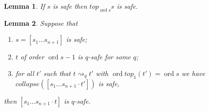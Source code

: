 \documentclass{article}
\newcommand{\ord}{\mathop{\mathrm{ord}}}
\newtheorem{lemma}{Lemma}[section]
\theoremstyle{remark}
\theoremstyle{definition}
\newcommand\saferel\rightsquigarrow
\begin{document}
\begin{lemma}
If $s$ is safe then $top_{\ord{s}} s$ is safe.
\end{lemma}
\begin{lemma}
Suppose that
\begin{enumerate}[1.]
\item $s = [s_1 \ldots s_{n+1}]$ is safe;
\item $t$ of order $\ord{s}-1$ is $q$-safe for some $q$;
\item for all $t'$ such that $t\saferel_q t'$ with
$\ord{top_1(t')} = \ord{s}$ we have $collapse([s_1 \ldots
s_{n+1} \cdot t'])$ is safe,
\end{enumerate}
then $[s_1 \ldots s_{n+1} \cdot t]$ is $q$-safe.
\end{lemma}
\end{document}
